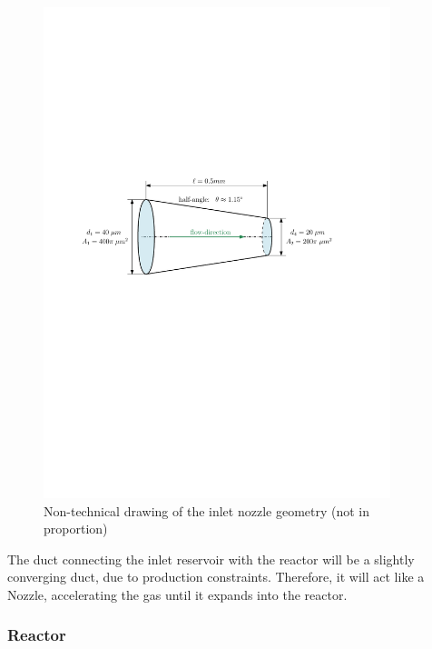 	\begin{figure}[H]
	    \centering
	    \includegraphics[width=0.9\textwidth]{src/03_analytical-work/fig_inlet-nozzle-geometry.pdf}
	    \caption{Non-technical drawing of the inlet nozzle geometry (not in proportion)}
	    \label{fig:geometry-inlet-nozzle}
	\end{figure}
	The duct connecting the inlet reservoir with the reactor will be a slightly converging duct, due to production constraints.
	Therefore, it will act like a Nozzle, accelerating the gas until it expands into the reactor.
	
\subsubsection*{Reactor}

